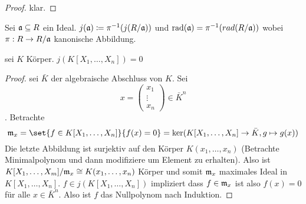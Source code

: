 \begin{proof}
	klar.
\end{proof}
\begin{Def}
	Sei \(\mathfrak{a}\subseteq R\) ein Ideal. \(j(\mathfrak{a})\coloneq \pi^{-1}(j(R/\mathfrak{a}))\) und \(\operatorname{rad}(\mathfrak{a})=\pi^{-1}(rad(R/\mathfrak{a}))\) wobei \(\pi:R\to R/\mathfrak{a}\) kanonische Abbildung.
\end{Def}
\begin{Satz}
	sei \(K\) Körper. \(j(K[X_1,\dots,X_n])=0\)
\end{Satz}
\begin{proof}
	sei \(\bar K\) der algebraische Abschluss von \(K\).
	Sei  \[x=\begin{pmatrix}
		x_1\\ \vdots\\ x_n
	\end{pmatrix}\in \bar K^n\] . Betrachte 
	\[\frakm_x=\set{f\in K[X_1,\dots,X_n]}{f(x)=0}=\ker(K[X_1,\dots,X_n]\to\bar K, g\mapsto g(x))\]
	Die letzte Abbildung ist surjektiv auf den Körper \(K(x_1,\dots,x_n)\) (Betrachte Minimalpolynom und dann modifiziere um Element zu erhalten).
	Also ist \(K[X_1,\dots,X_m]/\mathfrak{m}_x\cong K(x_1,\dots,x_n)\) Körper und somit \(\mathfrak{m}_x\) maximales Ideal in \(K[X_1,\dots,X_n]\).
	\(f\in j(K[X_1,\dots,X_n])\) impliziert dass \(f\in\mathfrak{m}_x\) ist also \(f(x)=0\) für alle \(x\in\bar K^{n}\). Also ist \(f\) das Nullpolynom nach Induktion.
\end{proof}

